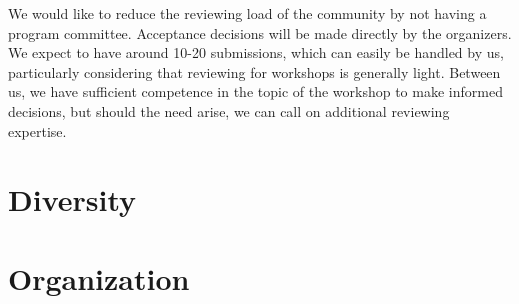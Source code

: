 \documentclass[10pt]{article}
\begin{document}
We would like to reduce the reviewing load of the community by not having a
program committee. Acceptance decisions will be made directly by the organizers.
We expect to have around 10-20 submissions, which can easily be handled by us,
particularly considering that reviewing for workshops is generally light.
Between us, we have sufficient competence in the topic of the workshop to make
informed decisions, but should the need arise, we can call on additional
reviewing expertise.


\section*{Diversity}


\section*{Organization}

\end{document}
